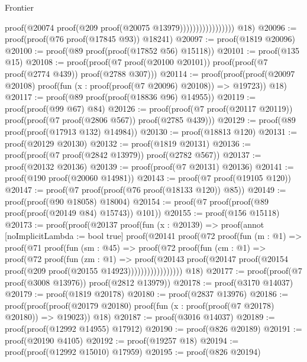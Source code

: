 \begin{lexlean}{Frontier}
\begin{coremodule}
                                                proof(@20074
                                                    proof(@209 proof(@20075 @13979)))))))))))))))))
      @18)
@20096 := proof(proof(@76 proof(@17845 @93)) @18241)
@20097 := proof(@1819 @20096)
@20100 := proof(@89 proof(proof(@17852 @56) @15118))
@20101 := proof(@135 @15)
@20108 := proof(proof(@7 proof(@20100 @20101)) proof(proof(@7 proof(@2774 @439)) proof(@2788 @307)))
@20114 := proof(proof(proof(@20097 @20108)
        proof(fun (x : proof(proof(@7 @20096) @20108)) => @19723))
      @18)
@20117 := proof(@89 proof(proof(@18836 @96) @14955))
@20119 := proof(proof(@99 @67) @84)
@20126 := proof(proof(@7 proof(@20117 @20119)) proof(proof(@7 proof(@2806 @567)) proof(@2785 @439)))
@20129 := proof(@89 proof(proof(@17913 @132) @14984))
@20130 := proof(@18813 @120)
@20131 := proof(@20129 @20130)
@20132 := proof(@1819 @20131)
@20136 := proof(proof(@7 proof(@2842 @13979)) proof(@2782 @567))
@20137 := proof(@20132 @20136)
@20139 := proof(proof(@7 @20131) @20136)
@20141 := proof(@190 proof(@20060 @14981))
@20143 := proof(@7 proof(@19105 @120))
@20147 := proof(@7 proof(proof(@76 proof(@18133 @120)) @85))
@20149 := proof(proof(@90 @18058) @18004)
@20154 := proof(@7 proof(proof(@89 proof(proof(@20149 @84) @15743)) @101))
@20155 := proof(@156 @15118)
@20173 := proof(proof(@20137
        proof(fun (x : @20139) =>
          proof(annot [noImplicitLambda := bool true]
            proof(@20141
                proof(@72
                    proof(fun (m : @1) =>
                      proof(@71
                          proof(fun (sm : @45) =>
                            proof(@72
                                proof(fun (cm : @1) =>
                                  proof(@72
                                      proof(fun (zm : @1) =>
                                        proof(@20143
                                            proof(@20147
                                                proof(@20154
                                                    proof(@209 proof(@20155 @14923)))))))))))))))))
      @18)
@20177 := proof(proof(@7 proof(@3008 @13976)) proof(@2812 @13979))
@20178 := proof(@3170 @14037)
@20179 := proof(@1819 @20178)
@20180 := proof(@2837 @13976)
@20186 := proof(proof(proof(@20179 @20180)
        proof(fun (x : proof(proof(@7 @20178) @20180)) => @19023))
      @18)
@20187 := proof(@3016 @14037)
@20189 := proof(proof(@12992 @14955) @17912)
@20190 := proof(@826 @20189)
@20191 := proof(@20190 @4105)
@20192 := proof(@19257 @18)
@20194 := proof(proof(@12992 @15010) @17959)
@20195 := proof(@826 @20194)

\end{coremodule}
\end{lexlean}
